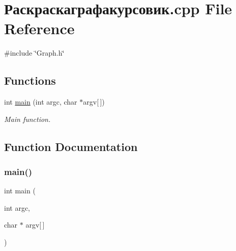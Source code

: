 \hypertarget{_xD0_xA0_xD0_xB0_xD1_x81_xD0_xBA_xD1_x80_xD0_xB0_xD1_x81_xD0_xBA_xD0_xB0_xD0_xB3_xD1_x80_xD0_xB0e8d2baa48db8d36c224eee98dfe2bd71}{}\section{Раскраскаграфакурсовик.\+cpp File Reference}
\label{_xD0_xA0_xD0_xB0_xD1_x81_xD0_xBA_xD1_x80_xD0_xB0_xD1_x81_xD0_xBA_xD0_xB0_xD0_xB3_xD1_x80_xD0_xB0e8d2baa48db8d36c224eee98dfe2bd71}
{\ttfamily \#include \char`\"{}Graph.\+h\char`\"{}}\newline
\subsection*{Functions}
\begin{DoxyCompactItemize}
\item 
int \mbox{\hyperlink{_xD0_xA0_xD0_xB0_xD1_x81_xD0_xBA_xD1_x80_xD0_xB0_xD1_x81_xD0_xBA_xD0_xB0_xD0_xB3_xD1_x80_xD0_xB0e8d2baa48db8d36c224eee98dfe2bd71_a0ddf1224851353fc92bfbff6f499fa97}{main}} (int argc, char $\ast$argv\mbox{[}$\,$\mbox{]})
\begin{DoxyCompactList}\small\item\em Main function. \end{DoxyCompactList}\end{DoxyCompactItemize}


\subsection{Function Documentation}
\mbox{\label{_xD0_xA0_xD0_xB0_xD1_x81_xD0_xBA_xD1_x80_xD0_xB0_xD1_x81_xD0_xBA_xD0_xB0_xD0_xB3_xD1_x80_xD0_xB0e8d2baa48db8d36c224eee98dfe2bd71_a0ddf1224851353fc92bfbff6f499fa97}} 
\subsubsection{\texorpdfstring{main()}{main()}}
{\footnotesize\ttfamily int main (\begin{DoxyParamCaption}\item[{int}]{argc,  }\item[{char $\ast$}]{argv\mbox{[}$\,$\mbox{]} }\end{DoxyParamCaption})}



